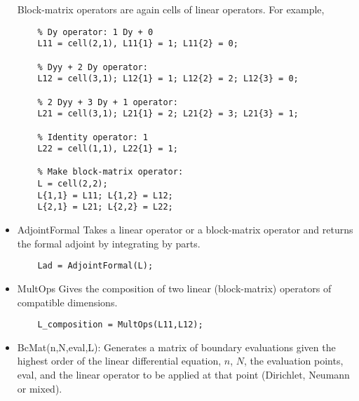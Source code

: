 \documentclass[%
secnumarabic,%
 amssymb, amsmath,%
 aps,prf,superscriptaddress,longbibliography
frontmatterverbose,
]{revtex4-2}
\begin{document}
\begin{itemize}
  Block-matrix operators are again cells of linear operators. For example, 
  \begin{lstlisting}
    % Dy operator: 1 Dy + 0
    L11 = cell(2,1), L11{1} = 1; L11{2} = 0;

    % Dyy + 2 Dy operator:
    L12 = cell(3,1); L12{1} = 1; L12{2} = 2; L12{3} = 0;

    % 2 Dyy + 3 Dy + 1 operator:
    L21 = cell(3,1); L21{1} = 2; L21{2} = 3; L21{3} = 1;

    % Identity operator: 1
    L22 = cell(1,1), L22{1} = 1;

    % Make block-matrix operator:
    L = cell(2,2);
    L{1,1} = L11; L{1,2} = L12;
    L{2,1} = L21; L{2,2} = L22;
  \end{lstlisting}
  \item {\sf AdjointFormal} Takes a linear operator or a block-matrix operator and returns the formal adjoint by integrating by parts.
  \begin{lstlisting}
    Lad = AdjointFormal(L);
  \end{lstlisting}
  \item {\sf MultOps} Gives the composition of two linear (block-matrix) operators of compatible dimensions.
  \begin{lstlisting}
    L_composition = MultOps(L11,L12);
  \end{lstlisting}
  \item \textsf{BcMat(n,N,eval,L)}: Generates a matrix of boundary evaluations given the highest order of the linear differential equation, $n$, $N$, the evaluation points, \textsf{eval}, and the linear operator to be applied at that point (Dirichlet, Neumann or mixed). %
  
\end{itemize}
\end{document}
